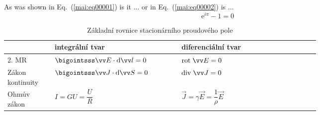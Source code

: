 \documentclass{scrbook}
\begin{document}
\shorthandoff{-}

  \frontmatter
    
    \tableofcontents
  \mainmatter 
    \setcounter{page}{3} 

    As was shown in Eq.~(\ref{mai:eq00001}) is it
    ... or in Eq.~(\ref{mai:eq00002}) is ...
    \begin{equation}
      \mathrm{e}^{i\pi}-1=0 \label{fyz:eq00001}
    \end{equation}

    \begin{table}[ht!]
      \centering
      \begin{tabular}{m{0.1\linewidth}|m{0.29\linewidth}|m{0.34\linewidth}|}
        \cline{2-3}
        \multicolumn{1}{l|}{} 
          & \textbf{integrální tvar} & \textbf{diferenciální tvar}                              \\
        \hline        
        \multicolumn{1}{|m{0.19\linewidth}|}{2. MR}         
          & \(\bigointsss\vec{E}\cdot \dd{\vec{l}} = 0\) & \(\rot{E} = 0\)                      \\ 
        \cline{1-3}       
        \hline        
        \multicolumn{1}{|m{0.19\linewidth}|}{Zákon kontinuity}        
          & \(\bigointsss\vec{J}\cdot \dd{\vec{S}}=0\) & \(\diver{J}=0\)                        \\
        \cline{1-3}       
        \multicolumn{1}{|m{0.19\linewidth}|}{Ohmův zákon}       
          & \(I=GU=\dfrac{U}{R}\) & \(\vec{J} = \gamma\vec{E} = \dfrac{1}{\rho}\vec{E}\)        \\
        \cline{1-3}
      \end{tabular}
      \caption{Základní rovnice stacionárního proudového pole}
    \end{table}

  \backmatter
\end{document}
